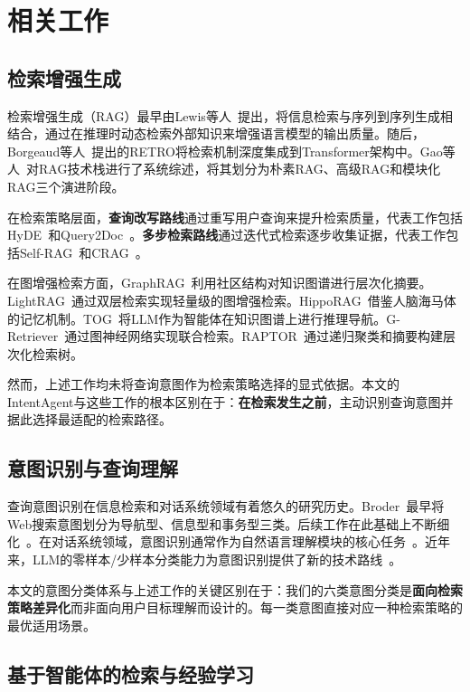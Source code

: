 \documentclass[runningheads]{llncs}
\begin{document}
\section{相关工作}

\subsection{检索增强生成}

检索增强生成（RAG）最早由Lewis等人~\cite{ref1}提出，将信息检索与序列到序列生成相结合，通过在推理时动态检索外部知识来增强语言模型的输出质量。随后，Borgeaud等人~\cite{ref3}提出的RETRO将检索机制深度集成到Transformer架构中。Gao等人~\cite{ref2}对RAG技术栈进行了系统综述，将其划分为朴素RAG、高级RAG和模块化RAG三个演进阶段。

在检索策略层面，\textbf{查询改写路线}通过重写用户查询来提升检索质量，代表工作包括HyDE~\cite{ref4}和Query2Doc~\cite{ref5}。\textbf{多步检索路线}通过迭代式检索逐步收集证据，代表工作包括Self-RAG~\cite{ref6}和CRAG~\cite{ref7}。

在图增强检索方面，GraphRAG~\cite{ref27}利用社区结构对知识图谱进行层次化摘要。LightRAG~\cite{ref26}通过双层检索实现轻量级的图增强检索。HippoRAG~\cite{ref28}借鉴人脑海马体的记忆机制。TOG~\cite{ref24}将LLM作为智能体在知识图谱上进行推理导航。G-Retriever~\cite{ref25}通过图神经网络实现联合检索。RAPTOR~\cite{ref23}通过递归聚类和摘要构建层次化检索树。

然而，上述工作均未将查询意图作为检索策略选择的显式依据。本文的IntentAgent与这些工作的根本区别在于：\textbf{在检索发生之前}，主动识别查询意图并据此选择最适配的检索路径。

\subsection{意图识别与查询理解}

查询意图识别在信息检索和对话系统领域有着悠久的研究历史。Broder~\cite{ref8}最早将Web搜索意图划分为导航型、信息型和事务型三类。后续工作在此基础上不断细化~\cite{ref9,ref10}。在对话系统领域，意图识别通常作为自然语言理解模块的核心任务~\cite{ref11}。近年来，LLM的零样本/少样本分类能力为意图识别提供了新的技术路线~\cite{ref12}。

本文的意图分类体系与上述工作的关键区别在于：我们的六类意图分类是\textbf{面向检索策略差异化}而非面向用户目标理解而设计的。每一类意图直接对应一种检索策略的最优适用场景。

\subsection{基于智能体的检索与经验学习}
\end{document}
